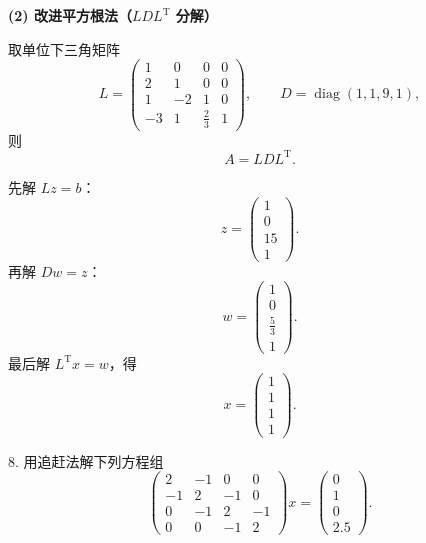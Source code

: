 \documentclass[11pt, a4paper]{ctexart}
\begin{document}
\begin{solution}
    \vspace{1em}
    \textbf{(2) 改进平方根法（$LDL^{\mathrm{T}}$ 分解）}

    取单位下三角矩阵
    \[
        L =
        \begin{pmatrix}
            1 & 0 & 0 & 0 \\
            2 & 1 & 0 & 0 \\
            1 & -2 & 1 & 0 \\
            -3 & 1 & \frac{2}{3} & 1
        \end{pmatrix},
        \qquad
        D = \operatorname{diag}(1, 1, 9, 1),
    \]
    则
    \[
        A = LDL^{\mathrm{T}}.
    \]

    先解 $Lz = b$：
    \[
        z =
        \begin{pmatrix}
            1 \\
            0 \\
            15 \\
            1
        \end{pmatrix}.
    \]
    再解 $Dw = z$：
    \[
        w =
        \begin{pmatrix}
            1 \\
            0 \\
            \frac{5}{3} \\
            1
        \end{pmatrix}.
    \]
    最后解 $L^{\mathrm{T}}x = w$，得
    \[
        x =
        \begin{pmatrix}
            1 \\
            1 \\
            1 \\
            1
        \end{pmatrix}.
    \]
\end{solution}


\begin{problem}{8. 用追赶法解下列方程组}
    \[
        \begin{pmatrix}
            2 & -1 & 0 & 0 \\
            -1 & 2 & -1 & 0 \\
            0 & -1 & 2 & -1 \\
            0 & 0 & -1 & 2
        \end{pmatrix}
        x
        =
        \begin{pmatrix}
            0 \\
            1 \\
            0 \\
            2.5
        \end{pmatrix}.
    \]
\end{problem}
\end{document}
